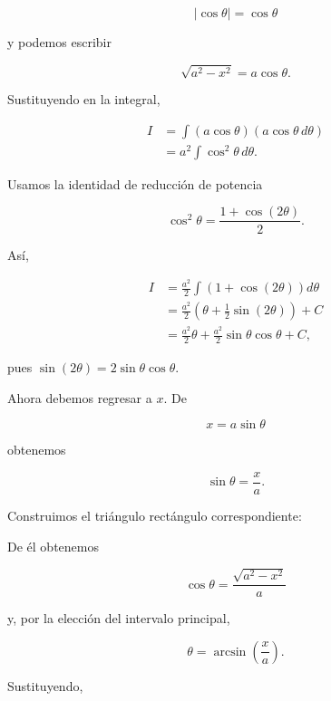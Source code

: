 \documentclass[12pt]{article}
\theoremstyle{definition}
\theoremstyle{remark}
\begin{document}
\[
|\cos\theta|=\cos\theta
\]

y podemos escribir

\[
\sqrt{a^2-x^2}=a\cos\theta.
\]

Sustituyendo en la integral,

\begin{align*}
I
&=\int(a\cos\theta)(a\cos\theta\,d\theta)\\
&=a^2\int\cos^2\theta\,d\theta.
\end{align*}

Usamos la identidad de reducción de potencia

\[
\cos^2\theta=\frac{1+\cos(2\theta)}{2}.
\]

Así,

\begin{align*}
I
&=\frac{a^2}{2}\int\left(1+\cos(2\theta)\right)d\theta\\
&=\frac{a^2}{2}\left(\theta+\frac12\sin(2\theta)\right)+C\\
&=\frac{a^2}{2}\theta+
\frac{a^2}{2}\sin\theta\cos\theta+C,
\end{align*}

pues $\sin(2\theta)=2\sin\theta\cos\theta$.

Ahora debemos regresar a $x$. De

\[
x=a\sin\theta
\]

obtenemos

\[
\sin\theta=\frac{x}{a}.
\]

Construimos el triángulo rectángulo correspondiente:

\begin{center}
\end{center}

De él obtenemos

\[
\cos\theta=\frac{\sqrt{a^2-x^2}}{a}
\]

y, por la elección del intervalo principal,

\[
\theta=\arcsin\left(\frac{x}{a}\right).
\]

Sustituyendo,
\end{document}
